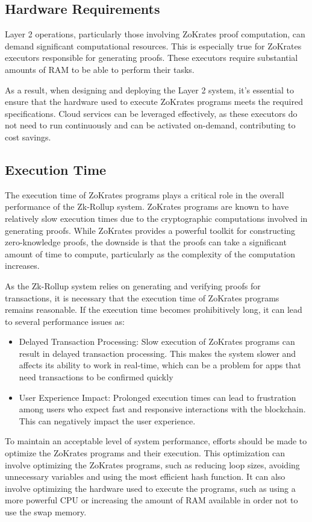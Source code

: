 \subsection{Hardware Requirements}

Layer 2 operations, particularly those involving ZoKrates proof computation, can demand significant computational resources. This is especially true for ZoKrates executors responsible for generating proofs. These executors require substantial amounts of RAM to be able to perform their tasks.

As a result, when designing and deploying the Layer 2 system, it's essential to ensure that the hardware used to execute ZoKrates programs meets the required specifications. Cloud services can be leveraged effectively, as these executors do not need to run continuously and can be activated on-demand, contributing to cost savings.

\subsection{Execution Time}

The execution time of ZoKrates programs plays a critical role in the overall performance of the Zk-Rollup system. ZoKrates programs are known to have relatively slow execution times due to the cryptographic computations involved in generating proofs. While ZoKrates provides a powerful toolkit for constructing zero-knowledge proofs, the downside is that the proofs can take a significant amount of time to compute, particularly as the complexity of the computation increases.

As the Zk-Rollup system relies on generating and verifying proofs for transactions, it is necessary that the execution time of ZoKrates programs remains reasonable. If the execution time becomes prohibitively long, it can lead to several performance issues as:

\begin{itemize}
    \item Delayed Transaction Processing: Slow execution of ZoKrates programs can result in delayed transaction processing. This makes the system slower and affects its ability to work in real-time, which can be a problem for apps that need transactions to be confirmed quickly
    \item User Experience Impact: Prolonged execution times can lead to frustration among users who expect fast and responsive interactions with the blockchain. This can negatively impact the user experience.
\end{itemize}

To maintain an acceptable level of system performance, efforts should be made to optimize the ZoKrates programs and their execution. This optimization can involve optimizing the ZoKrates programs, such as reducing loop sizes, avoiding unnecessary variables and using the most efficient hash function. It can also involve optimizing the hardware used to execute the programs, such as using a more powerful CPU or increasing the amount of RAM available in order not to use the swap memory.
